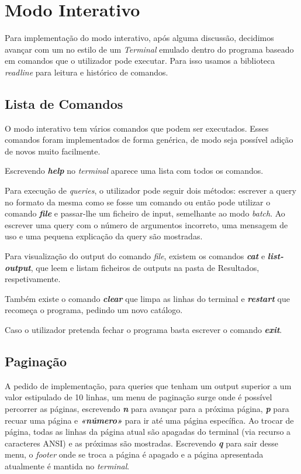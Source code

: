 \documentclass{article}
\begin{document}
    \section{Modo Interativo}
            Para implementação do modo interativo, após alguma discussão, 
            decidimos avançar com um no estilo de um \emph{Terminal} emulado dentro do programa
            baseado em comandos que o utilizador pode executar.
            Para isso usamos a biblioteca \emph{readline} para leitura e histórico de comandos.
        \subsection{Lista de Comandos}
            O modo interativo tem vários comandos que podem ser executados.
            Esses comandos foram implementados de forma genérica, de modo seja possível adição de novos muito facilmente.
            
            Escrevendo \textit{\textbf{help}} no \textit{terminal }aparece uma lista com todos os comandos.

            Para execução de \emph{queries}, o utilizador pode seguir dois métodos: escrever a query
            no formato da mesma como se fosse um comando 
            ou então pode utilizar o comando \textit{\textbf{file}} e passar-lhe um ficheiro
            de input, semelhante ao modo \textit{batch}. Ao escrever uma query com o número de argumentos
            incorreto, uma mensagem de uso e uma pequena explicação da query são mostradas.

            Para visualização do output do comando \textit{file}, existem os comandos
            \textit{\textbf{cat}} e \textit{\textbf{list-output}}, que leem e listam ficheiros de outputs
            na pasta de Resultados, respetivamente.

            Também existe o comando \textit{\textbf{clear}} que limpa as linhas do terminal
            e \textit{\textbf{restart}} que recomeça o programa, pedindo um novo catálogo.

            Caso o utilizador pretenda fechar o programa basta escrever o comando \textit{\textbf{exit}}.
        \pagebreak
        \subsection{Paginação}
            A pedido de implementação, para queries que tenham um output superior a um valor estipulado de 10 linhas,
            um menu de paginação surge onde é possível percorrer as páginas, escrevendo \textit{\textbf{n}} para avançar
            para a próxima página, \textit{\textbf{p}} para recuar uma página e \textit{\textbf{«número»}}
            para ir até uma página específica.
            Ao trocar de página, todas as linhas da página atual são apagadas do terminal
            (via recurso a caracteres ANSI) e as próximas são mostradas.
            Escrevendo \textit{\textbf{q}} para sair desse menu, o \textit{footer} 
            onde se troca a página é apagado e a página apresentada atualmente é mantida no \textit{terminal}.
\end{document}
